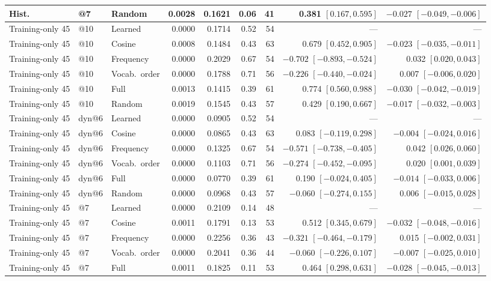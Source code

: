 \begin{center}
\begin{tabular}{lllrrrrrr}
Hist. & @7 & Random & 0.0028 & 0.1621 & 0.06 & 41 & 0.381 $[0.167,0.595]$ & $-0.027$ $[-0.049,-0.006]$\\
\midrule
Training-only 45 & @10 & Learned & 0.0000 & 0.1714 & 0.52 & 54 & --- & ---\\
Training-only 45 & @10 & Cosine & 0.0008 & 0.1484 & 0.43 & 63 & 0.679 $[0.452,0.905]$ & $-0.023$ $[-0.035,-0.011]$\\
Training-only 45 & @10 & Frequency & 0.0000 & 0.2029 & 0.67 & 54 & $-0.702$ $[-0.893,-0.524]$ & 0.032 $[0.020,0.043]$\\
Training-only 45 & @10 & Vocab.\ order & 0.0000 & 0.1788 & 0.71 & 56 & $-0.226$ $[-0.440,-0.024]$ & 0.007 $[-0.006,0.020]$\\
Training-only 45 & @10 & Full & 0.0013 & 0.1415 & 0.39 & 61 & 0.774 $[0.560,0.988]$ & $-0.030$ $[-0.042,-0.019]$\\
Training-only 45 & @10 & Random & 0.0019 & 0.1545 & 0.43 & 57 & 0.429 $[0.190,0.667]$ & $-0.017$ $[-0.032,-0.003]$\\
Training-only 45 & dyn@6 & Learned & 0.0000 & 0.0905 & 0.52 & 54 & --- & ---\\
Training-only 45 & dyn@6 & Cosine & 0.0000 & 0.0865 & 0.43 & 63 & 0.083 $[-0.119,0.298]$ & $-0.004$ $[-0.024,0.016]$\\
Training-only 45 & dyn@6 & Frequency & 0.0000 & 0.1325 & 0.67 & 54 & $-0.571$ $[-0.738,-0.405]$ & 0.042 $[0.026,0.060]$\\
Training-only 45 & dyn@6 & Vocab.\ order & 0.0000 & 0.1103 & 0.71 & 56 & $-0.274$ $[-0.452,-0.095]$ & 0.020 $[0.001,0.039]$\\
Training-only 45 & dyn@6 & Full & 0.0000 & 0.0770 & 0.39 & 61 & 0.190 $[-0.024,0.405]$ & $-0.014$ $[-0.033,0.006]$\\
Training-only 45 & dyn@6 & Random & 0.0000 & 0.0968 & 0.43 & 57 & $-0.060$ $[-0.274,0.155]$ & 0.006 $[-0.015,0.028]$\\
Training-only 45 & @7 & Learned & 0.0000 & 0.2109 & 0.14 & 48 & --- & ---\\
Training-only 45 & @7 & Cosine & 0.0011 & 0.1791 & 0.13 & 53 & 0.512 $[0.345,0.679]$ & $-0.032$ $[-0.048,-0.016]$\\
Training-only 45 & @7 & Frequency & 0.0000 & 0.2256 & 0.36 & 43 & $-0.321$ $[-0.464,-0.179]$ & 0.015 $[-0.002,0.031]$\\
Training-only 45 & @7 & Vocab.\ order & 0.0000 & 0.2041 & 0.36 & 44 & $-0.060$ $[-0.226,0.107]$ & $-0.007$ $[-0.025,0.010]$\\
Training-only 45 & @7 & Full & 0.0011 & 0.1825 & 0.11 & 53 & 0.464 $[0.298,0.631]$ & $-0.028$ $[-0.045,-0.013]$\\

\end{tabular}
\end{center}
